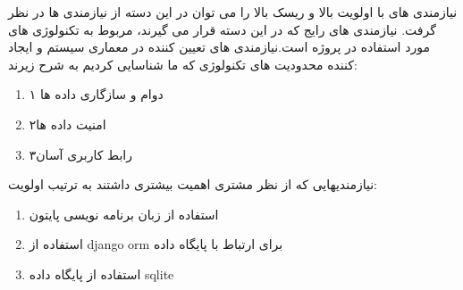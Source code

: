 

نیازمندی های با اولویت بالا و ریسک بالا را می توان در این دسته از نیازمندی ها در نظر گرفت. نیازمندی های رایج‌ که در این دسته قرار می‌ گیرند، مربوط به تکنولوژی های مورد استفاده در پروژه است.نیازمندی های تعیین کننده در معماری سیستم و ایجاد کننده محدودیت های تکنولوژی که ما شناسایی کردیم به شرح زیرند:
\begin{enumerate}[]
\item ۱ دوام و سازگاری داده ها

\item ۲امنیت داده ها 

\item ۳رابط کاربری آسان
\end{enumerate}

 نیازمندیهایی که از نظر مشتری اهمیت بیشتری داشتند به ترتیب اولویت:

 \begin{enumerate}[]
    
 \item   استفاده از زبان برنامه نویسی پایتون

 \item  استفاده از  django orm برای ارتباط با پایگاه داده

 \item  استفاده از پایگاه داده sqlite
 
\end{enumerate}
